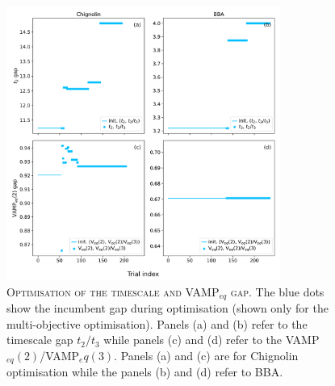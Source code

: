 \documentclass{article}
\begin{document}
\begin{figure}[ht]
    \centering
    \includegraphics[width=0.8\textwidth]{SI_figures/optimisation_gap_summary.pdf}
    \caption{\textsc{Optimisation of the timescale and VAMP$_{eq}$ gap.} The blue dots show the incumbent gap during optimisation (shown only for the multi-objective optimisation). Panels (a) and (b) refer to the timescale gap $t_2/t_3$ while panels (c) and (d) refer to the VAMP$_{eq}(2)$/VAMP$_eq(3)$. Panels (a) and (c) are for Chignolin optimisation while the panels (b) and (d) refer to BBA.}
    \label{fig:gap_optimiation}
\end{figure}

\FloatBarrier
\clearpage


\end{document}
